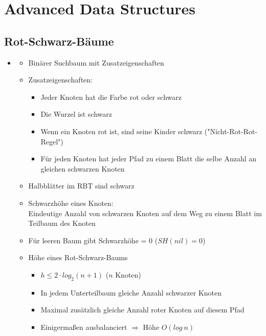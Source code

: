 \documentclass[
    12pt,
    a4paper,
    ngerman,
    color=3b,%
    marginpar=false,
    colorback=false,
    leqno,
]{tudaexercise}
\begin{document}
\section{Advanced Data Structures}\label{Advanced Data Structures}
\subsection{Rot-Schwarz-Bäume}\label{Rot-Schwarz-Baeume}
    \begin{itemize}
        \item {}
            \begin{itemize}
                \item Binärer Suchbaum mit Zusatzeigenschaften
                \item Zusatzeigenschaften:
                    \begin{itemize}
                        \item Jeder Knoten hat die Farbe rot oder schwarz
                        \item Die Wurzel ist schwarz
                        \item Wenn ein Knoten rot ist, sind seine Kinder schwarz (\string"Nicht-Rot-Rot-Regel\string")
                        \item Für jeden Knoten hat jeder Pfad zu einem Blatt die selbe Anzahl an gleichen schwarzen Knoten
                    \end{itemize}
                \item Halbblätter im RBT sind schwarz
                \item Schwarzhöhe eines Knoten: \\
                        Eindeutige Anzahl von schwarzen Knoten auf dem Weg zu einem Blatt im Teilbaum des Knoten
                \item Für leeren Baum gibt Schwarzhöhe = 0 ($SH(nil)=0$)
                \item Höhe eines Rot-Schwarz-Baums
                    \begin{itemize}
                        \item $h \leq 2 \cdot log_2(n+1)$  ($n$ Knoten)
                        \item In jedem Unterteilbaum gleiche Anzahl schwarzer Knoten
                        \item Maximal zusätzlich gleiche Anzahl roter Knoten auf diesem Pfad
                        \item Einigermaßen ausbalanciert $\Rightarrow$ Höhe $O(log~n)$

\end{itemize}
\end{itemize}
\end{itemize}
\end{document}

